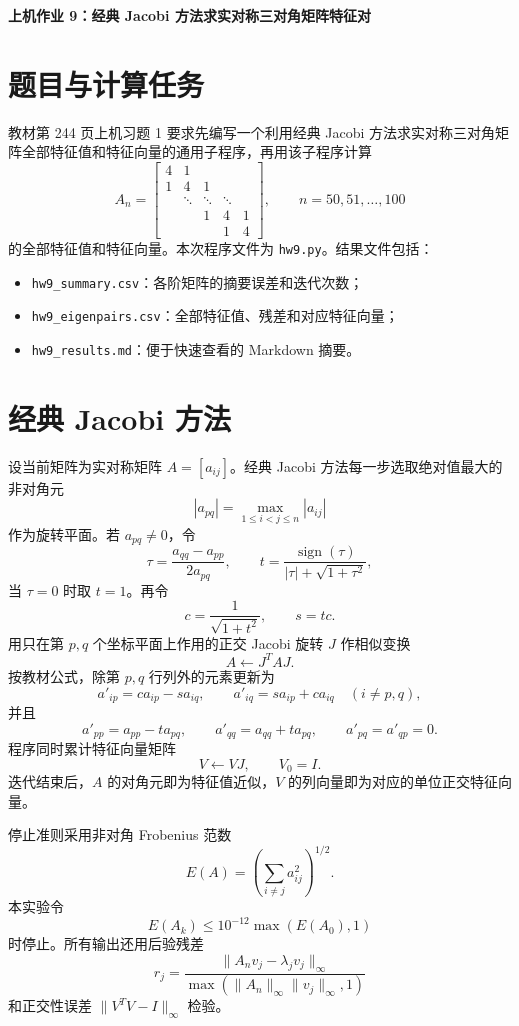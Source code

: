 \documentclass[a4paper,11pt]{article}
\newcommand{\file}[1]{\texttt{\small #1}}
\begin{document}
\begin{center}
    \Large\textbf{上机作业 9：经典 Jacobi 方法求实对称三对角矩阵特征对}
\end{center}

\section{题目与计算任务}
教材第 244 页上机习题 1 要求先编写一个利用经典 Jacobi 方法求实对称三对角矩阵全部特征值和特征向量的通用子程序，再用该子程序计算
\[
    A_n=
    \begin{bmatrix}
    4&1&&&\\
    1&4&1&&\\
     &\ddots&\ddots&\ddots&\\
     &&1&4&1\\
     &&&1&4
    \end{bmatrix},\qquad n=50,51,\ldots,100
\]
的全部特征值和特征向量。本次程序文件为 \file{hw9.py}。结果文件包括：
\begin{itemize}
    \item \file{hw9\_summary.csv}：各阶矩阵的摘要误差和迭代次数；
    \item \file{hw9\_eigenpairs.csv}：全部特征值、残差和对应特征向量；
    \item \file{hw9\_results.md}：便于快速查看的 Markdown 摘要。
\end{itemize}

\section{经典 Jacobi 方法}
设当前矩阵为实对称矩阵 $A=[a_{ij}]$。经典 Jacobi 方法每一步选取绝对值最大的非对角元
\[
    |a_{pq}|=\max_{1\le i<j\le n}|a_{ij}|
\]
作为旋转平面。若 $a_{pq}\ne 0$，令
\[
    \tau=\frac{a_{qq}-a_{pp}}{2a_{pq}},\qquad
    t=\frac{\operatorname{sign}(\tau)}
    {|\tau|+\sqrt{1+\tau^2}},
\]
当 $\tau=0$ 时取 $t=1$。再令
\[
    c=\frac1{\sqrt{1+t^2}},\qquad s=tc .
\]
用只在第 $p,q$ 个坐标平面上作用的正交 Jacobi 旋转 $J$ 作相似变换
\[
    A\leftarrow J^T A J .
\]
按教材公式，除第 $p,q$ 行列外的元素更新为
\[
    a'_{ip}=c a_{ip}-s a_{iq},\qquad
    a'_{iq}=s a_{ip}+c a_{iq}\quad (i\ne p,q),
\]
并且
\[
    a'_{pp}=a_{pp}-t a_{pq},\qquad
    a'_{qq}=a_{qq}+t a_{pq},\qquad
    a'_{pq}=a'_{qp}=0 .
\]
程序同时累计特征向量矩阵
\[
    V\leftarrow VJ,\qquad V_0=I .
\]
迭代结束后，$A$ 的对角元即为特征值近似，$V$ 的列向量即为对应的单位正交特征向量。

停止准则采用非对角 Frobenius 范数
\[
    E(A)=\left(\sum_{i\ne j}a_{ij}^2\right)^{1/2}.
\]
本实验令
\[
    E(A_k)\le 10^{-12}\max(E(A_0),1)
\]
时停止。所有输出还用后验残差
\[
    r_j=\frac{\|A_nv_j-\lambda_jv_j\|_\infty}
    {\max(\|A_n\|_\infty\|v_j\|_\infty,1)}
\]
和正交性误差 $\|V^TV-I\|_\infty$ 检验。
\end{document}
